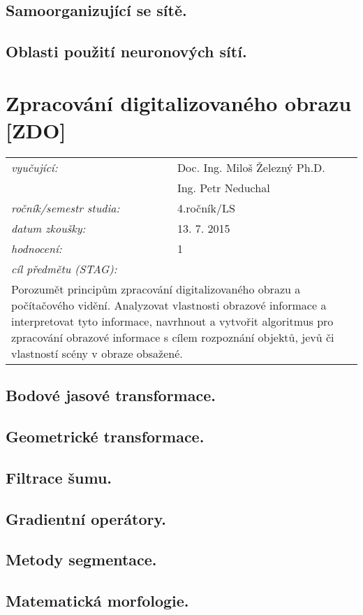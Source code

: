 \subsection{Samoorganizující se sítě.}

\subsection{Oblasti použití neuronových sítí.}

\section{Zpracování digitalizovaného obrazu [ZDO]}

\begin{table}[H]
\centering
\begin{tabular}{p{4cm} p{12cm}}
\textit{vyučující:}             & Doc. Ing. Miloš Železný Ph.D. \\
								 & Ing. Petr Neduchal \\
\textit{ročník/semestr studia:} & 4.ročník/LS \\
\textit{datum zkoušky:}         & 13. 7. 2015 \\
\textit{hodnocení:}             & 1 \\
\textit{cíl předmětu (STAG):}   & \\
\multicolumn{2}{p{16cm}}{Porozumět principům zpracování digitalizovaného obrazu a počítačového vidění. Analyzovat vlastnosti obrazové informace a interpretovat tyto informace, navrhnout a vytvořit algoritmus pro zpracování obrazové informace s cílem rozpoznání objektů, jevů či vlastností scény v obraze obsažené.}
\end{tabular}
\end{table}

\subsection{Bodové jasové transformace.}

\subsection{Geometrické transformace.}

\subsection{Filtrace šumu.}

\subsection{Gradientní operátory.}

\subsection{Metody segmentace.}

\subsection{Matematická morfologie.}